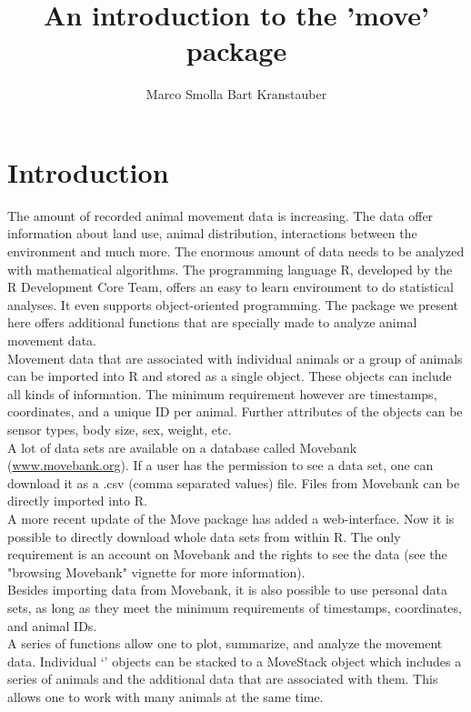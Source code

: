 \documentclass[article,nojss]{jss}
\author{Marco Smolla \And Bart Kranstauber}
\title{An introduction to the 'move' package}
\newcommand{\class}[1]{{`\code{#1}'}}
\begin{document}





\section*{Introduction}
The amount of recorded animal movement data is increasing. The data offer information about land use, animal distribution, interactions between the environment and much more. The enormous amount of data needs to be analyzed with mathematical algorithms. The programming language R, developed by the R Development Core Team, offers an easy to learn environment to do statistical analyses. It even supports object-oriented programming. The package we present here offers additional functions that are specially made to analyze animal movement data. \\
Movement data that are associated with individual animals or a group of animals can be imported into R and stored as a single object. These objects can include all kinds of information. The minimum requirement however are timestamps, coordinates, and a unique ID per animal. Further attributes of the objects can be sensor types, body size, sex, weight, etc. \\
A lot of data sets are available on a database called Movebank (\url{www.movebank.org}). If a user has the permission to see a data set, one can download it as a .csv (comma separated values) file. Files from Movebank can be directly imported into R. \\
A more recent update of the Move package has added a web-interface. Now it is possible to directly download whole data sets from within R. The only requirement is an account on Movebank and the rights to see the data (see the "browsing Movebank" vignette for more information). \\
Besides importing data from Movebank, it is also possible to use personal data sets, as long as they meet the minimum requirements of timestamps, coordinates, and animal IDs. \\
A series of functions allow one to plot, summarize, and analyze the movement data. Individual \class{Move} objects can be stacked to a MoveStack object which includes a series of animals and the additional data that are associated with them. This allows one to work with many animals at the same time. \\
\end{document}
